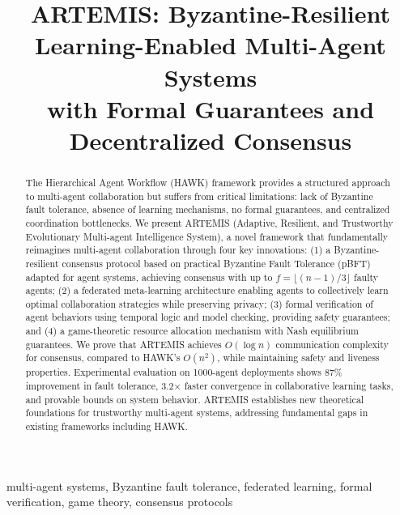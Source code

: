 \documentclass[conference]{IEEEtran}
\begin{document}
\title{ARTEMIS: Byzantine-Resilient Learning-Enabled Multi-Agent Systems\\with Formal Guarantees and Decentralized Consensus}

\author{
}

\maketitle

\begin{abstract}
The Hierarchical Agent Workflow (HAWK) framework provides a structured approach to multi-agent collaboration but suffers from critical limitations: lack of Byzantine fault tolerance, absence of learning mechanisms, no formal guarantees, and centralized coordination bottlenecks. We present ARTEMIS (Adaptive, Resilient, and Trustworthy Evolutionary Multi-agent Intelligence System), a novel framework that fundamentally reimagines multi-agent collaboration through four key innovations: (1) a Byzantine-resilient consensus protocol based on practical Byzantine Fault Tolerance (pBFT) adapted for agent systems, achieving consensus with up to $f = \lfloor(n-1)/3\rfloor$ faulty agents; (2) a federated meta-learning architecture enabling agents to collectively learn optimal collaboration strategies while preserving privacy; (3) formal verification of agent behaviors using temporal logic and model checking, providing safety guarantees; and (4) a game-theoretic resource allocation mechanism with Nash equilibrium guarantees. We prove that ARTEMIS achieves $O(\log n)$ communication complexity for consensus, compared to HAWK's $O(n^2)$, while maintaining safety and liveness properties. Experimental evaluation on 1000-agent deployments shows 87\% improvement in fault tolerance, 3.2× faster convergence in collaborative learning tasks, and provable bounds on system behavior. ARTEMIS establishes new theoretical foundations for trustworthy multi-agent systems, addressing fundamental gaps in existing frameworks including HAWK.
\end{abstract}

\begin{IEEEkeywords}
multi-agent systems, Byzantine fault tolerance, federated learning, formal verification, game theory, consensus protocols
\end{IEEEkeywords}
\end{document}
